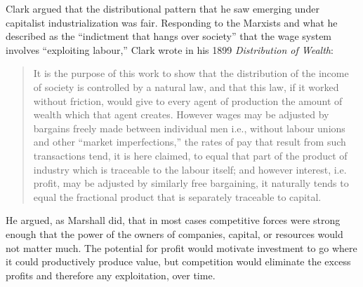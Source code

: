 
Clark  argued that the distributional pattern that he saw emerging under capitalist industrialization was fair. Responding to the Marxists and what  he described as the ``indictment that hangs over society'' that the wage system involves ``exploiting labour,'' Clark wrote in his 1899 \textit{Distribution of Wealth}:
\begin{quotation}
It is the purpose of this work to show that the distribution of the income of society is controlled by a natural law, and that this law, if it worked without friction, would give to every agent of production the amount of wealth which that agent creates. However wages may be adjusted by bargains freely made between individual men i.e., without labour unions and other ``market imperfections,'' the rates of pay that result from such transactions tend, it is here claimed, to equal that part of the product of industry which is traceable to the labour itself; and however interest, i.e. profit, may be adjusted by similarly free bargaining, it naturally tends to equal the fractional product that is separately traceable to capital.
\end{quotation}
He argued, as Marshall did, that in most cases competitive forces were strong enough that the power of the owners of companies, capital, or resources would not matter much. The potential for profit would motivate investment to go where it could productively produce value, but competition would eliminate the excess profits and therefore any exploitation,  over time. 

